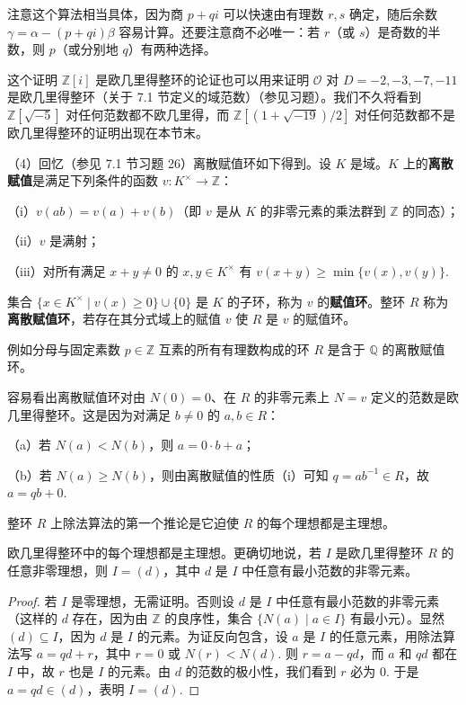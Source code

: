 \begin{example}
注意这个算法相当具体，因为商 \(p+qi\) 可以快速由有理数 \(r, s\) 确定，随后余数 \(\gamma = \alpha - (p+qi)\beta\) 容易计算。还要注意商不必唯一：若 \(r\)（或 \(s\)）是奇数的半数，则 \(p\)（或分别地 \(q\)）有两种选择。

这个证明 \(\mathbb{Z}[i]\) 是欧几里得整环的论证也可以用来证明 \(\mathcal{O}\) 对 \(D = -2, -3, -7, -11\) 是欧几里得整环（关于 7.1 节定义的域范数）（参见习题）。我们不久将看到 \(\mathbb{Z}[\sqrt{-5}]\) 对任何范数都不欧几里得，而 \(\mathbb{Z}[(1+\sqrt{-19})/2]\) 对任何范数都不是欧几里得整环的证明出现在本节末。

（4）回忆（参见 7.1 节习题 26）离散赋值环如下得到。设 \(K\) 是域。\(K\) 上的\textbf{离散赋值}是满足下列条件的函数 \(v : K^\times \to \mathbb{Z}\)：

（i）\(v(ab) = v(a) + v(b)\)（即 \(v\) 是从 \(K\) 的非零元素的乘法群到 \(\mathbb{Z}\) 的同态）；

（ii）\(v\) 是满射；

（iii）对所有满足 \(x+y \neq 0\) 的 \(x, y \in K^\times\) 有 \(v(x+y) \geq \min\{v(x), v(y)\}\).

集合 \(\{x \in K^\times \mid v(x) \geq 0\} \cup \{0\}\) 是 \(K\) 的子环，称为 \(v\) 的\textbf{赋值环}。整环 \(R\) 称为\textbf{离散赋值环}，若存在其分式域上的赋值 \(v\) 使 \(R\) 是 \(v\) 的赋值环。

例如分母与固定素数 \(p \in \mathbb{Z}\) 互素的所有有理数构成的环 \(R\) 是含于 \(\mathbb{Q}\) 的离散赋值环。

容易看出离散赋值环对由 \(N(0) = 0\)、在 \(R\) 的非零元素上 \(N = v\) 定义的范数是欧几里得整环。这是因为对满足 \(b \neq 0\) 的 \(a, b \in R\)：

（a）若 \(N(a) < N(b)\)，则 \(a = 0\cdot b + a\)；

（b）若 \(N(a) \geq N(b)\)，则由离散赋值的性质（i）可知 \(q = ab^{-1} \in R\)，故 \(a = qb + 0\).
\end{example}

整环 \(R\) 上除法算法的第一个推论是它迫使 \(R\) 的每个理想都是主理想。

\begin{proposition}\label{pro:8.1}
欧几里得整环中的每个理想都是主理想。更确切地说，若 \(I\) 是欧几里得整环 \(R\) 的任意非零理想，则 \(I = (d)\)，其中 \(d\) 是 \(I\) 中任意有最小范数的非零元素。
\end{proposition}

\begin{proof}
若 \(I\) 是零理想，无需证明。否则设 \(d\) 是 \(I\) 中任意有最小范数的非零元素（这样的 \(d\) 存在，因为由 \(\mathbb{Z}\) 的良序性，集合 \(\{N(a) \mid a \in I\}\) 有最小元）。显然 \((d) \subseteq I\)，因为 \(d\) 是 \(I\) 的元素。为证反向包含，设 \(a\) 是 \(I\) 的任意元素，用除法算法写 \(a = qd + r\)，其中 \(r = 0\) 或 \(N(r) < N(d)\). 则 \(r = a - qd\)，而 \(a\) 和 \(qd\) 都在 \(I\) 中，故 \(r\) 也是 \(I\) 的元素。由 \(d\) 的范数的极小性，我们看到 \(r\) 必为 0. 于是 \(a = qd \in (d)\)，表明 \(I = (d)\).
\end{proof}

